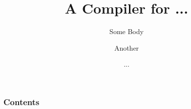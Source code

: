 \documentclass{beamer}
\begin{document}
\title{A Compiler for ... }
\author{Some Body \and Another \and ...}
\date{}
\frame{\titlepage}

\begin{frame}
\frametitle{Contents}
\end{frame}
\end{document}
